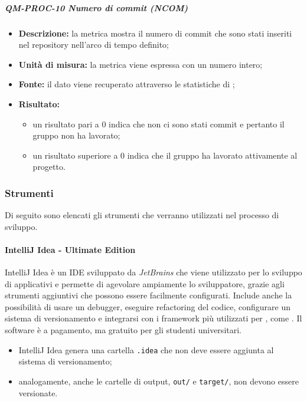 			\subparagraph{QM-PROC-10 Numero di commit (NCOM)}

			\begin{itemize}
      			\item \textbf{Descrizione: }
				la metrica mostra il numero di commit che sono stati inseriti nel repository nell'arco di tempo definito;

				\item \textbf{Unità di misura: }
				la metrica viene espressa con un numero intero;

				\item \textbf{Fonte: }
				il dato viene recuperato attraverso le statistiche di ;

				\item \textbf{Risultato: }
				\begin{itemize}
					\item un risultato pari a 0 indica che non ci sono stati commit e pertanto il gruppo non ha lavorato;
					\item un risultato superiore a 0 indica che il gruppo ha lavorato attivamente al progetto.
				\end{itemize}
			\end{itemize}



		\subsubsection{Strumenti}
			Di seguito sono elencati gli strumenti che verranno utilizzati nel processo di sviluppo.

				\paragraph{IntelliJ Idea - Ultimate Edition}
					IntelliJ Idea è un IDE sviluppato da \textit{JetBrains} che viene utilizzato per lo sviluppo di applicativi  e permette di agevolare ampiamente lo sviluppatore, grazie agli strumenti aggiuntivi che possono essere facilmente configurati.
					\newline
					Include anche la possibilità di usare un debugger, eseguire refactoring del codice, configurare un sistema di versionamento e integrarsi con i framework più utilizzati per , come .
					\newline
					Il software è a pagamento, ma gratuito per gli studenti universitari.

					\begin{itemize}
						\item IntelliJ Idea genera una cartella \verb!.idea! che non deve essere aggiunta al sistema di versionamento;
						\item analogamente, anche le cartelle di output, \verb!out/! e \verb!target/!, non devono essere versionate.
					\end{itemize}

